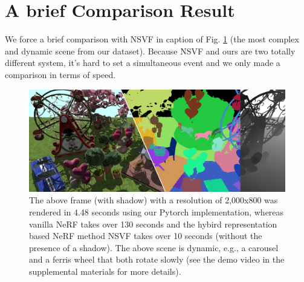 \documentclass[letterpaper]{article} %
\begin{document}
\section{A brief Comparison Result}
We force a brief comparison with NSVF \cite{liu2020neural} in caption of Fig. \ref{fig:teaser} (the most complex and dynamic scene from our dataset). Because NSVF and ours are two totally different system, it's hard to set a simultaneous event and we only made a comparison in terms of speed.

\begin{figure}[htbp]
  \includegraphics[width=\linewidth]{figure/teaser.png}
  \caption{
  The above frame (with shadow) with a resolution of 2,000x800 was rendered in 4.48 seconds using our Pytorch implementation, whereas vanilla NeRF takes over 130 seconds and the hybird representation based NeRF method NSVF \cite{liu2020neural} takes over 10 seconds (without the presence of a shadow). The above scene is dynamic, e.g., a carousel and a ferris wheel that both rotate slowly (see the demo video in the supplemental materials for more details).
  }
  \label{fig:teaser}
\end{figure}
\end{document}
